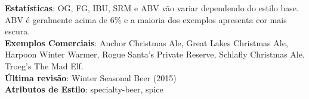 \textbf{Estatísticas}: OG, FG, IBU, SRM e ABV vão variar dependendo do estilo base. ABV é geralmente acima de 6\% e a maioria dos exemplos apresenta cor mais escura. \\
\textbf{Exemplos Comerciais}: Anchor Christmas Ale, Great Lakes Christmas Ale, Harpoon Winter Warmer, Rogue Santa's Private Reserve, Schlafly Christmas Ale, Troeg's The Mad Elf. \\
\textbf{Última revisão}: Winter Seasonal Beer (2015) \\
\textbf{Atributos de Estilo}: specialty-beer, spice
